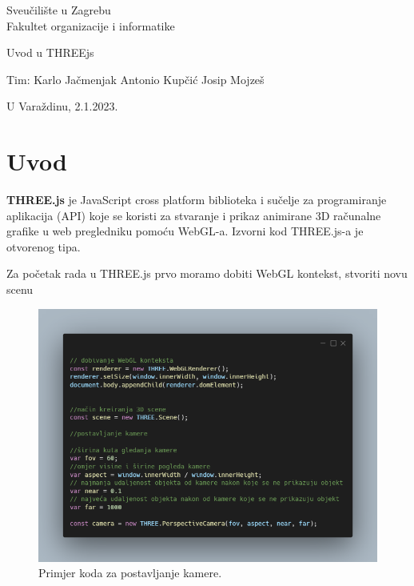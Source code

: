 \documentclass[a4paper,12pt]{article}
\begin{document}
\thispagestyle{empty}
\begin{center}
Sveučilište u Zagrebu\\
Fakultet organizacije i informatike
\end{center}
\vfill
\begin{center}
\Large Uvod u THREEjs
\end{center}
\vfill
\begin{flushright}
Tim: Karlo Jačmenjak \break
Antonio Kupčić \break
Josip Mojzeš \break
\end{flushright}
U Varaždinu, 2.1.2023. 

\newpage
\setcounter{page}{1}

\section{Uvod}
\textbf{THREE.js} je JavaScript cross platform biblioteka i sučelje za programiranje aplikacija (API) koje se koristi za stvaranje i prikaz animirane 3D računalne grafike u web pregledniku pomoću WebGL-a. Izvorni kod THREE.js-a je otvorenog tipa.

\begin{flushleft}
    Za početak rada u THREE.js prvo moramo dobiti WebGL kontekst, stvoriti novu scenu 
\end{flushleft}


\begin{figure}[ht]
    \centering
    \includegraphics[scale=0.5]{image/zadatak1.png}
    \caption{Primjer koda za postavljanje kamere.}
\end{figure}
\end{document}
